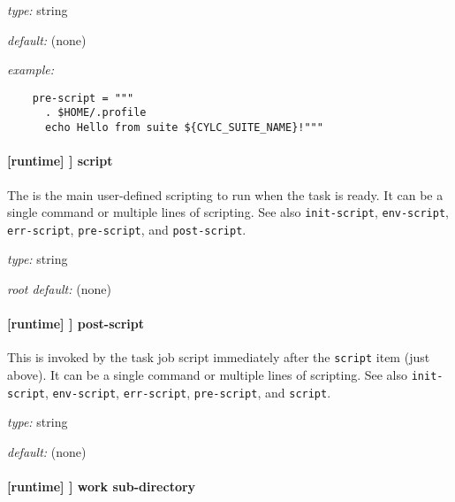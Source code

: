 \begin{myitemize}
\item {\em type:} string
\item {\em default:} (none)
\item {\em example:}
 \begin{lstlisting}
    pre-script = """
      . $HOME/.profile
      echo Hello from suite ${CYLC_SUITE_NAME}!"""
 \end{lstlisting}
\end{myitemize}

\paragraph[script]{[runtime] \textrightarrow [[\_\_NAME\_\_]] \textrightarrow script}
\label{ScriptItem}

The is the main user-defined scripting to run when the task is ready. It can be a
single command or multiple lines of scripting. See also \lstinline=init-script=,
\lstinline=env-script=, \lstinline=err-script=, \lstinline=pre-script=, and
\lstinline=post-script=.

\begin{myitemize}
\item {\em type:} string
\item {\em root default:} (none)
\end{myitemize}

\paragraph[post-script]{ [runtime] \textrightarrow [[\_\_NAME\_\_]] \textrightarrow post-script}

This is invoked by the task job script immediately after the \lstinline=script=
item (just above).  It can be a single command or multiple lines of scripting.
See also
\lstinline=init-script=, \lstinline=env-script=, \lstinline=err-script=,
\lstinline=pre-script=, and \lstinline=script=.

\begin{myitemize}
\item {\em type:} string
\item {\em default:} (none)
\end{myitemize}

\paragraph[work sub-directory]{[runtime] \textrightarrow [[\_\_NAME\_\_]] \textrightarrow work sub-directory}
\label{worksubdirectory}


